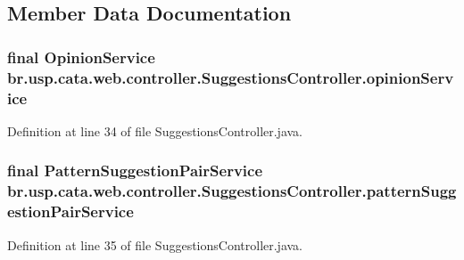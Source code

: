 \subsection{Member Data Documentation}
\hypertarget{classbr_1_1usp_1_1cata_1_1web_1_1controller_1_1_suggestions_controller_a3736df2e57069c47dbfa3553bd6b12e6}{
\subsubsection[{opinion\+Service}]{\setlength{\rightskip}{0pt plus 5cm}final {\bf Opinion\+Service} br.\+usp.\+cata.\+web.\+controller.\+Suggestions\+Controller.\+opinion\+Service\hspace{0.3cm}{\ttfamily [private]}}}\label{classbr_1_1usp_1_1cata_1_1web_1_1controller_1_1_suggestions_controller_a3736df2e57069c47dbfa3553bd6b12e6}


Definition at line 34 of file Suggestions\+Controller.\+java.

\hypertarget{classbr_1_1usp_1_1cata_1_1web_1_1controller_1_1_suggestions_controller_a30ec0498fb9a213449943cc44480af49}{
\subsubsection[{pattern\+Suggestion\+Pair\+Service}]{\setlength{\rightskip}{0pt plus 5cm}final {\bf Pattern\+Suggestion\+Pair\+Service} br.\+usp.\+cata.\+web.\+controller.\+Suggestions\+Controller.\+pattern\+Suggestion\+Pair\+Service\hspace{0.3cm}{\ttfamily [private]}}}\label{classbr_1_1usp_1_1cata_1_1web_1_1controller_1_1_suggestions_controller_a30ec0498fb9a213449943cc44480af49}


Definition at line 35 of file Suggestions\+Controller.\+java.

